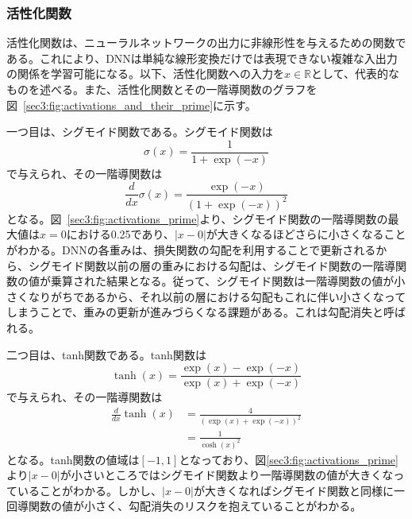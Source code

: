 \documentclass[12pt]{jarticle}
\numberwithin{equation}{section}    %
\numberwithin{figure}{section}      %
\numberwithin{table}{section}      %
\begin{document}
\subsubsection{活性化関数}
活性化関数は、ニューラルネットワークの出力に非線形性を与えるための関数である。これにより、DNNは単純な線形変換だけでは表現できない複雑な入出力の関係を学習可能になる。以下、活性化関数への入力を$x \in \mathbb{R}$として、代表的なものを述べる。また、活性化関数とその一階導関数のグラフを図~\ref{sec3:fig:activations_and_their_prime}に示す。

一つ目は、シグモイド関数である。シグモイド関数は
\begin{equation}
    \sigma(x) = \frac{1}{1 + \exp(-x)}
\end{equation}
で与えられ、その一階導関数は
\begin{equation}
    \frac{d}{dx}\sigma(x) = \frac{\exp(-x)}{(1 + \exp(-x))^{2}}
\end{equation}
となる。図~\ref{sec3:fig:activations_prime}より、シグモイド関数の一階導関数の最大値は$x=0$における0.25であり、$|x - 0|$が大きくなるほどさらに小さくなることがわかる。DNNの各重みは、損失関数の勾配を利用することで更新されるから、シグモイド関数以前の層の重みにおける勾配は、シグモイド関数の一階導関数の値が乗算された結果となる。従って、シグモイド関数は一階導関数の値が小さくなりがちであるから、それ以前の層における勾配もこれに伴い小さくなってしまうことで、重みの更新が進みづらくなる課題がある。これは勾配消失と呼ばれる。

二つ目は、tanh関数である。tanh関数は
\begin{equation}
    \tanh(x) = \frac{\exp(x) - \exp(-x)}{\exp(x) + \exp(-x)}
\end{equation}
で与えられ、その一階導関数は
\begin{align}
    \frac{d}{dx}\tanh(x) & = \frac{4}{(\exp(x) + \exp(-x))^{2}} \\
                         & = \frac{1}{\cosh(x)^{2}}
\end{align}
となる。tanh関数の値域は$[-1, 1]$となっており、図\ref{sec3:fig:activations_prime}より$|x - 0|$が小さいところではシグモイド関数より一階導関数の値が大きくなっていることがわかる。しかし、$|x - 0|$が大きくなればシグモイド関数と同様に一回導関数の値が小さく、勾配消失のリスクを抱えていることがわかる。
\end{document}
